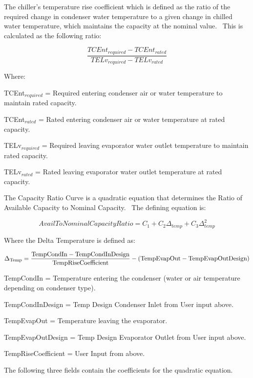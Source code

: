 The chiller's temperature rise coefficient which is defined as the ratio of the required change in condenser water temperature to a given change in chilled water temperature, which maintains the capacity at the nominal value.~ This is calculated as the following ratio:

\begin{equation}
\frac{{TCEn{t_{required}} - TCEn{t_{rated}}}}{{TEL{v_{required}} - TEL{v_{rated}}}}
\end{equation}

Where:

TCEnt\(_{required}\) = Required entering condenser air or water temperature to maintain rated capacity.

TCEnt\(_{rated}\) = Rated entering condenser air or water temperature at rated capacity.

TELv\(_{required}\) = Required leaving evaporator water outlet temperature to maintain rated capacity.

TELv\(_{rated}\) = Rated leaving evaporator water outlet temperature at rated capacity.

The Capacity Ratio Curve is a quadratic equation that determines the Ratio of Available Capacity to Nominal Capacity.~ The defining equation is:

\begin{equation}
AvailToNominalCapacityRatio = {C_1} + {C_2}{\Delta_{temp}} + {C_3}\Delta_{temp}^2
\end{equation}

Where the Delta Temperature is defined as:

\begin{equation}
{\Delta_{{\rm{Temp}}}} = \frac{{{\rm{TempCondIn  -  TempCondInDesign }}}}{{{\rm{TempRiseCoefficient}}}} - ({\rm{TempEvapOut  -  TempEvapOutDesign)}}
\end{equation}

TempCondIn = Temperature entering the condenser (water or air temperature depending on condenser type).

TempCondInDesign = Temp Design Condenser Inlet from User input above.

TempEvapOut = Temperature leaving the evaporator.

TempEvapOutDesign = Temp Design Evaporator Outlet from User input above.

TempRiseCoefficient = User Input from above.

The following three fields contain the coefficients for the quadratic equation.

